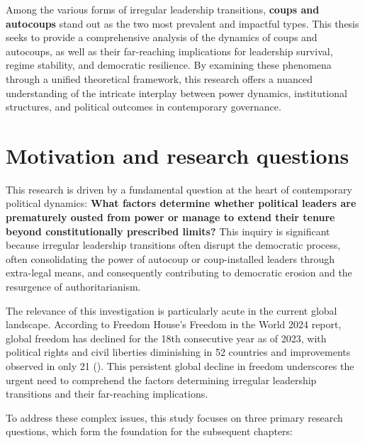 \documentclass[
  12pt,
]{report}
\begin{document}
Among the various forms of irregular leadership transitions,
\textbf{coups and autocoups} stand out as the two most prevalent and
impactful types. This thesis seeks to provide a comprehensive analysis
of the dynamics of coups and autocoups, as well as their far-reaching
implications for leadership survival, regime stability, and democratic
resilience. By examining these phenomena through a unified theoretical
framework, this research offers a nuanced understanding of the intricate
interplay between power dynamics, institutional structures, and
political outcomes in contemporary governance.

\section{Motivation and research
questions}\label{motivation-and-research-questions}

This research is driven by a fundamental question at the heart of
contemporary political dynamics: \textbf{What factors determine whether
political leaders are prematurely ousted from power or manage to extend
their tenure beyond constitutionally prescribed limits?} This inquiry is
significant because irregular leadership transitions often disrupt the
democratic process, often consolidating the power of autocoup or
coup-installed leaders through extra-legal means, and consequently
contributing to democratic erosion and the resurgence of
authoritarianism.

The relevance of this investigation is particularly acute in the current
global landscape. According to Freedom House's Freedom in the World 2024
report, global freedom has declined for the 18th consecutive year as of
2023, with political rights and civil liberties diminishing in 52
countries and improvements observed in only 21
(). This
persistent global decline in freedom underscores the urgent need to
comprehend the factors determining irregular leadership transitions and
their far-reaching implications.

To address these complex issues, this study focuses on three primary
research questions, which form the foundation for the subsequent
chapters:
\end{document}
